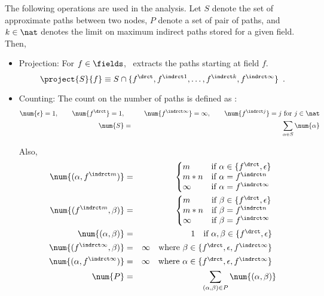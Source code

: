 The following operations are used in the analysis. Let $S$
denote the set of approximate paths between two nodes, $P$
denote a set of pair of paths, and $k \in \nat$ denotes the
limit on maximum indirect paths stored for a given
field. Then,
\begin{itemize}
\item Projection: For $f \in \fields$,
  \ extracts the paths starting at field $f$.
  $$\project{S}{f} \equiv S \cap \{f^{\drct}, f^{\indrct 1}, \ldots,
  f^{\indrct k}, f^{\indrct \infty}\} \enspace .$$

\item Counting: The count on the number of paths is defined
  as :
  \begin{eqnarray*}
   \num{\epsilon} =     1, \qquad
   \num{f^{\drct}} =     1, &\qquad&
   \num{f^{\indrct\infty}} =     \infty, \qquad
   \num{f^{\indrct j}} =  j \mbox{ for } j \in \nat \\
   \num{S} &=&   \sum_{\alpha \in S}\num{\alpha} 
  \end{eqnarray*}

Also,  
  \begin{eqnarray*}
   \num{(\alpha, f^{\indrct m})} &=&  \left\{ \begin{array}{@{}ll}  
   			m        &  \mbox{if } \alpha \in \{f^{\drct}, \epsilon\} \\
			m*n      &  \mbox{if } \alpha = f^{\indrct n} \\
			\infty   &  \mbox{if } \alpha = f^{\indrct\infty} \\
			\end{array}\right. \\
   \num{(f^{\indrct m}, \beta)} &=&  \left\{ \begin{array}{@{}ll}  
   			m        &  \mbox{if } \beta \in \{f^{\drct}, \epsilon\} \\
			m*n      &  \mbox{if } \beta = f^{\indrct n} \\
			\infty   &  \mbox{if } \beta = f^{\indrct\infty} \\
			\end{array}\right. \\
   \num{(\alpha, \beta)} &=&  \begin{array}{@{}ll}
   			 1       &  \mbox{if } \alpha, \beta \in \{f^{\drct}, \epsilon\} \\
			\end{array} \\
   \num{(f^{\indrct\infty}, \beta)} &=&  \begin{array}{@{}ll}
   			 \infty       &  \mbox{where }  \beta \in \{f^{\drct}, \epsilon, f^{\indrct\infty}\} \\
			\end{array} \\
   \num{(\alpha, f^{\indrct\infty})} &=&  \begin{array}{@{}ll}
   			 \infty       &  \mbox{where } \alpha \in \{f^{\drct}, \epsilon, f^{\indrct\infty}\} \\
			\end{array} \\
	\num{P} &=&   \sum_{(\alpha, \beta) \in P}\num{(\alpha, \beta)}		
  \end{eqnarray*}


\end{itemize}
